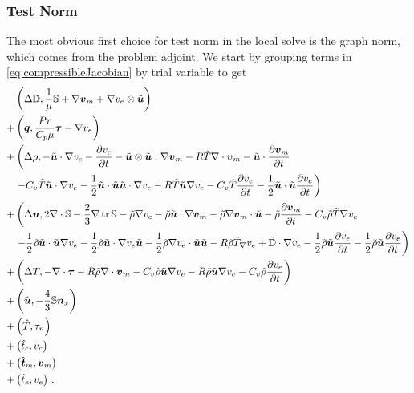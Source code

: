 \documentclass[Proposal.tex]{subfiles}
\begin{document}
\subsubsection{Test Norm}
The most obvious first choice for test norm in the local solve is the graph norm, which comes from the 
problem adjoint.
We start by grouping terms in \eqref{eq:compressibleJacobian} by trial variable to get
\begin{equation}
\begin{aligned}
&\left( \Delta\mathbb{D},\frac{1}{\mu}\mathbb{S}+\nabla\boldsymbol v_m+\nabla v_e\otimes\tilde{\boldsymbol u} \right)\\
+&\left( \boldsymbol q,\frac{Pr}{C_p\mu}\boldsymbol\tau-\nabla v_e \right)\\
+&\left(\Delta\rho,-\tilde{\boldsymbol u}\cdot\nabla v_c-\frac{\partial v_c}{\partial t}
-\tilde{\boldsymbol u}\otimes\tilde{\boldsymbol u}:\nabla\boldsymbol v_m
-R\tilde T\nabla\cdot\boldsymbol v_m-\tilde{\boldsymbol u}\cdot\frac{\partial\boldsymbol v_m}{\partial t}\right.\\
&\left.-C_v\tilde T\tilde{\boldsymbol u}\cdot\nabla v_e-\frac{1}{2}\tilde{\boldsymbol u}\cdot\tilde{\boldsymbol u}\tilde{\boldsymbol u}\cdot\nabla v_e
-R\tilde T\tilde{\boldsymbol u}\nabla v_e
-C_v\tilde T\frac{\partial v_e}{\partial t}-\frac{1}{2}\tilde{\boldsymbol u}\cdot\tilde{\boldsymbol u}\frac{\partial v_e}{\partial t}
\right)\\
+&\left(\Delta\boldsymbol u,2\nabla\cdot\mathbb{S}-\frac{2}{3}\nabla\operatorname*{tr}{\mathbb{S}}
-\tilde\rho\nabla v_c
-\tilde\rho\tilde{\boldsymbol u}\cdot\nabla\boldsymbol v_m-\tilde\rho\nabla\boldsymbol v_m\cdot\tilde{\boldsymbol u}
-\tilde\rho\frac{\partial\boldsymbol v_m}{\partial t}
-C_v\tilde\rho\tilde T\nabla v_e\right.\\
&\left.
-\frac{1}{2}\tilde\rho\tilde{\boldsymbol u}\cdot\tilde{\boldsymbol u}\nabla v_e
-\frac{1}{2}\tilde\rho\tilde{\boldsymbol u}\cdot\nabla v_e\tilde{\boldsymbol u}
-\frac{1}{2}\tilde\rho\nabla v_e\cdot\tilde{\boldsymbol u}\tilde{\boldsymbol u}
-R\tilde\rho\tilde T_{\nabla} v_e
+\tilde{\mathbb{D}}\cdot\nabla v_e
-\frac{1}{2}\tilde\rho\tilde{\boldsymbol u}\frac{\partial v_e}{\partial t}
-\frac{1}{2}\tilde\rho\tilde{\boldsymbol u}\frac{\partial v_e}{\partial t}
\right)\\
+&\left(\Delta T,-\nabla\cdot\boldsymbol\tau
-R\tilde\rho\nabla\cdot\boldsymbol v_m
-C_v\tilde\rho\tilde{\boldsymbol u}\nabla v_e
-R\tilde\rho\tilde{\boldsymbol u}\nabla v_e
-C_v\tilde\rho\frac{\partial v_e}{\partial t}
\right)\\
+&\left( \hat{\boldsymbol u},-\frac{4}{3}\mathbb{S}\boldsymbol n_x \right)\\
+&\left( \hat T,\tau_n \right)\\
+&\left( \hat t_c,v_c \right)\\
+&\left( \hat{\boldsymbol t}_m,\boldsymbol v_m \right)\\
+&\left( \hat t_e,v_e \right)\,.
\end{aligned}	
\end{equation}
\end{document}
